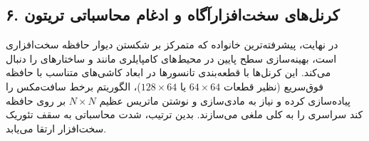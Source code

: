 \documentclass[12pt,a4paper]{report}
\theoremstyle{definition}
\begin{document}
\subsection{۶. کرنل‌های سخت‌افزارآگاه و ادغام محاسباتی تریتون }
در نهایت، پیشرفته‌ترین خانواده که متمرکز بر شکستن دیوار حافظه سخت‌افزاری است، بهینه‌سازی سطح پایین در محیط‌های کامپایلری مانند  و ساختارهای  را دنبال می‌کند. این کرنل‌ها با قطعه‌بندی تانسورها در ابعاد کاشی‌های متناسب با حافظه فوق‌سریع  (نظیر قطعات $64 \times 64$ یا $128 \times 64$)، الگوریتم برخط سافت‌مکس  را پیاده‌سازی کرده و نیاز به مادی‌سازی و نوشتن ماتریس عظیم $N \times N$ بر روی حافظه کند سراسری  را به کلی ملغی می‌سازند. بدین ترتیب، شدت محاسباتی به سقف تئوریک سخت‌افزار ارتقا می‌یابد.
\end{document}
